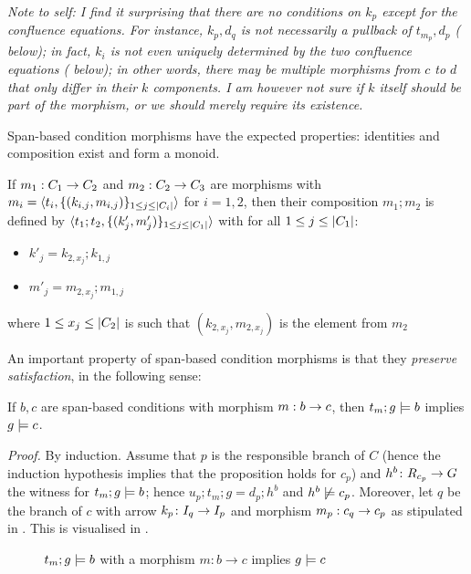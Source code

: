 \medskip\noindent
\emph{Note to self: I find it surprising that there are no conditions on $k_p$ except for the confluence equations. For instance, $k_p,d_q$ is \emph{not} necessarily a pullback of $t_{m_p},d_p$ ( below); in fact, $k_i$ is \emph{not even} uniquely determined by the two confluence equations ( below); in other words, there may be multiple morphisms from $c$ to $d$ that only differ in their $k$ components. I am however not sure if $k$ itself should be part of the morphism, or we should merely require its existence.}

\medskip\noindent Span-based condition morphisms have the expected properties: identities and composition exist and form a monoid.

\begin{definition}
\end{definition}

\begin{definition}
  If $m_1:C_1\rightarrow C_2$ and $m_2:C_2\rightarrow C_3$ are morphisms with $m_i=\langle{t_i,\{{(k_{i,j},m_{i,j})}\}_{1\leq j\leq |{C_i}|}}\rangle$ for $i=1,2$, then their composition $m_1;m_2$ is defined by $\langle{t_1;t_2,\{{(k'_j,m'_j)}\}_{1\leq j\leq |{C_1}|}}\rangle$ with for all $1\leq j\leq |{C_1}|$:
  \begin{itemize}
  \item $k'_j=k_{2,x_j};k_{1,j}$
  \item $m'_j=m_{2,x_j};m_{1,j}$
  \end{itemize}
  where $1\leq x_j\leq |{C_2}|$ is such that $(k_{2,x_j},m_{2,x_j})$ is the element from $m_2$ 
\end{definition}

\begin{proposition}
\end{proposition}

\medskip\noindent An important property of span-based condition morphisms is that they \emph{preserve satisfaction}, in the following sense:
%
\begin{proposition}
If $b,c$ are span-based conditions with morphism $m:b\rightarrow c$, then $t_m;g\models b$ implies $g\models c$.
\end{proposition}
%
\emph{Proof.} By induction. Assume that $p$ is the responsible branch of $C$ (hence the induction hypothesis implies that the proposition holds for $c_p$) and $h^b\colon R_{c_p}\rightarrow G$ the witness for $t_m;g\models b$; hence $u_p;t_m;g=d_p;h^b$ and $h^b\not\models c_p$. Moreover, let $q$ be the branch of $c$ with arrow $k_p\colon I_q\rightarrow I_p$ and morphism $m_p:c_q\rightarrow c_p$ as stipulated in . This is visualised in .
%
\begin{figure}
  \centering
  
  \caption{$t_m;g\models b$ with a morphism $m:b\rightarrow c$ implies $g\models c$}
\end{figure}

